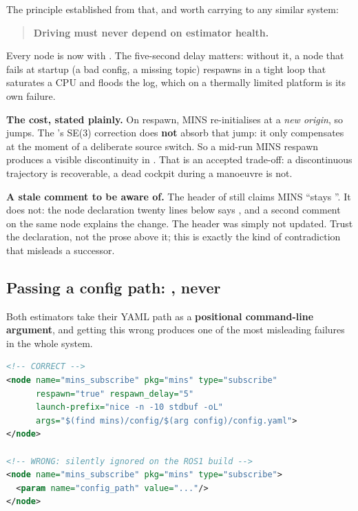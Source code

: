 The principle established from that, and worth carrying to any similar system:

\begin{quote}
\textbf{Driving must never depend on estimator health.}
\end{quote}

Every node is now  with . The
five-second delay matters: without it, a node that fails at startup (a bad
config, a missing topic) respawns in a tight loop that saturates a CPU and
floods the log, which on a thermally limited platform is its own failure.

\noindent \textbf{The cost, stated plainly.} On respawn, MINS re-initialises at
a \emph{new origin}, so  jumps. The
's SE(3) correction does \textbf{not} absorb that jump:
it only compensates at the moment of a deliberate source switch. So a
mid-run MINS respawn produces a visible discontinuity in
. That is an accepted trade-off: a discontinuous
trajectory is recoverable, a dead cockpit during a manoeuvre is not.

\noindent \textbf{A stale comment to be aware of.} The header of
 still claims MINS ``stays ''. It does
not: the node declaration twenty lines below says , and
a second comment on the same node explains the change. The header was simply not
updated. Trust the declaration, not the prose above it; this is exactly the kind
of contradiction that misleads a successor.

\subsection{Passing a config path: , never }
\label{ap:repro-argsparam}
Both estimators take their YAML path as a \textbf{positional command-line
argument}, and getting this wrong produces one of the most misleading failures
in the whole system.

\begin{lstlisting}[language=xml]
<!-- CORRECT -->
<node name="mins_subscribe" pkg="mins" type="subscribe"
      respawn="true" respawn_delay="5"
      launch-prefix="nice -n -10 stdbuf -oL"
      args="$(find mins)/config/$(arg config)/config.yaml">
</node>

<!-- WRONG: silently ignored on the ROS1 build -->
<node name="mins_subscribe" pkg="mins" type="subscribe">
  <param name="config_path" value="..."/>
</node>
\end{lstlisting}

